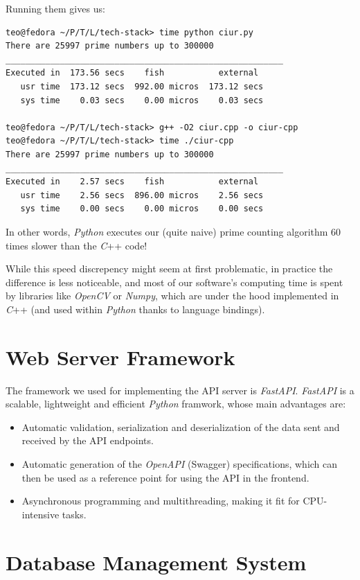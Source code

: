 \documentclass[11pt, a4paper]{report}
\begin{document}
Running them gives us:
\begin{verbatim}
teo@fedora ~/P/T/L/tech-stack> time python ciur.py
There are 25997 prime numbers up to 300000
________________________________________________________
Executed in  173.56 secs    fish           external
   usr time  173.12 secs  992.00 micros  173.12 secs
   sys time    0.03 secs    0.00 micros    0.03 secs

teo@fedora ~/P/T/L/tech-stack> g++ -O2 ciur.cpp -o ciur-cpp
teo@fedora ~/P/T/L/tech-stack> time ./ciur-cpp
There are 25997 prime numbers up to 300000
________________________________________________________
Executed in    2.57 secs    fish           external
   usr time    2.56 secs  896.00 micros    2.56 secs
   sys time    0.00 secs    0.00 micros    0.00 secs
\end{verbatim}

In other words, \textit{Python} executes our (quite naive) prime counting algorithm $60$ times slower than the \textit{C}++ code!

While this speed discrepency might seem at first problematic, in practice the difference is less noticeable, and most of our software's computing time is spent by libraries like \textit{OpenCV} or \textit{Numpy}, which are under the hood implemented in \textit{C}++ (and used within \textit{Python} thanks to language bindings).

\section{Web Server Framework}

The framework we used for implementing the API server is \textit{FastAPI}. \textit{FastAPI} is a scalable, lightweight and efficient \textit{Python} framwork, whose main advantages are:
\begin{itemize}
    \item Automatic validation, serialization and deserialization of the data sent and received by the API endpoints.
    \item Automatic generation of the \textit{OpenAPI}\cite{open-api} (Swagger) specifications, which can then be used as a reference point for using the API in the frontend.
    \item Asynchronous programming and multithreading, making it fit for CPU-intensive tasks.
\end{itemize}

\section{Database Management System}
\end{document}
